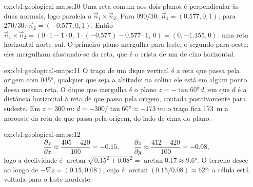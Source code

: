 \begin{solution}{exo:b1:geological-maps:10}
Uma reta comum aos dois planos é perpendicular às duas normais, logo paralela a $\vec n_1 \times \vec n_2$. Para $090/30$: $\vec n_1 = (0.577, 0,
1)$; para $270/30$: $\vec n_2 = (-0.577, 0, 1)$. Então $\vec n_1 \times \vec n_2
= (0\cdot 1 - 1\cdot 0,\ 1\cdot(-0.577) - 0.577\cdot 1,\ 0) = (0, -1.155,
0)$: uma reta horizontal norte--sul. O primeiro plano mergulha para leste, o segundo para oeste: eles mergulham afastando-se da reta, que é a crista de um  de eixo horizontal.
\end{solution}

\begin{solution}{exo:b1:geological-maps:11}
O traço de um dique vertical é a reta que passa pela origem com  \ang{045}, qualquer que seja a altitude: na colina ele está em algum ponto dessa mesma reta. O dique que mergulha é o plano $z = -\tan\ang{60}\,d$, em que $d$ é a distância horizontal à reta de  que passa pela origem, contada positivamente para sudeste. Em $z = \qty{300}{m}$: $d = -300/\tan\ang{60}
\approx \qty{-173}{m}$: o traço fica \qty{173}{m} a noroeste da reta de  que passa pela origem, do lado de cima do plano.
\end{solution}

\begin{solution}{exo:b1:geological-maps:12}
\[
  \frac{\partial z}{\partial x} \approx \frac{405 - 420}{100} = -0.15, \qquad
  \frac{\partial z}{\partial y} \approx \frac{412 - 420}{100} = -0.08,
\]
logo a declividade é $\arctan\sqrt{0.15^2 + 0.08^2} = \arctan 0.17 \approx
\ang{9.6}$. O terreno desce ao longo de $-\nabla z = (0.15, 0.08)$, cujo  é
$\arctan(0.15/0.08) \approx \ang{62}$: a célula está voltada para o leste-nordeste.
\end{solution}


